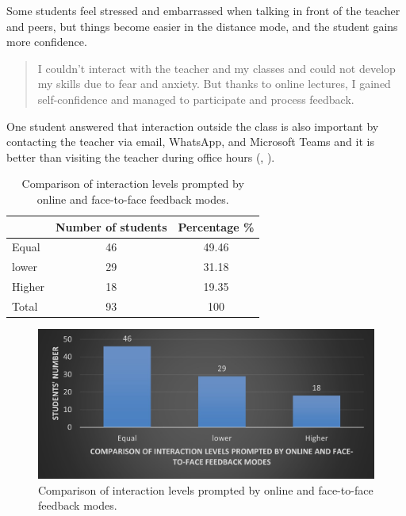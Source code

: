 \documentclass[english]{textolivre}
\begin{document}
Some students feel stressed and embarrassed when talking in front of the teacher and peers, but things become easier in the distance mode, and the student gains more confidence.

\begin{quote}
    I couldn’t interact with the teacher and my classes and could not develop my skills due to fear and anxiety. But thanks to online lectures, I gained self-confidence and managed to participate and process feedback.
\end{quote}

One student answered that interaction outside the class is also important by contacting the teacher via email, WhatsApp, and Microsoft Teams and it is better than visiting the teacher during office hours (, ).

\begin{table}[h!]
\centering
\begin{threeparttable}
\caption{Comparison of interaction levels prompted by online and face-to-face feedback modes.}
\label{tbl10}
\begin{tabular}{p{} c c}
\toprule
 & Number of students & Percentage \% \\ \midrule
Equal & 46 & 49.46 \\
lower & 29 & 31.18 \\
Higher & 18 & 19.35 \\
Total & 93 & 100 \\
\bottomrule
\end{tabular}
\end{threeparttable}
\end{table}

\begin{figure}[h!]
 \centering
 \begin{minipage}{.85\textwidth}
 \includegraphics[width=\textwidth]{10.jpg}
 \caption{Comparison of interaction levels prompted by online and face-to-face feedback modes.}
 \label{fig10}
 \end{minipage}
\end{figure}
\end{document}
